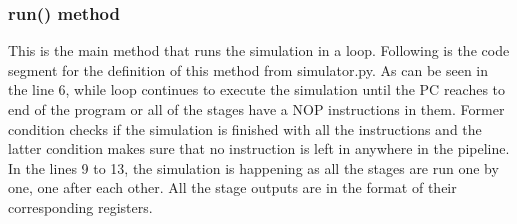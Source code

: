\subsubsection{run() method}
This is the main method that runs the simulation in a loop. Following is the code segment for the definition of this method from simulator.py. As can be seen in the line 6, while loop continues to execute the simulation until the PC reaches to end of the program or all of the stages have a NOP instructions in them. Former condition checks if the simulation is finished with all the instructions and the latter condition makes sure that no instruction is left in anywhere in the pipeline.
\\

\noindent In the lines 9 to 13, the simulation is happening as all the stages are run one by one, one after each other. All the stage outputs are in the format of their corresponding registers.
\\

